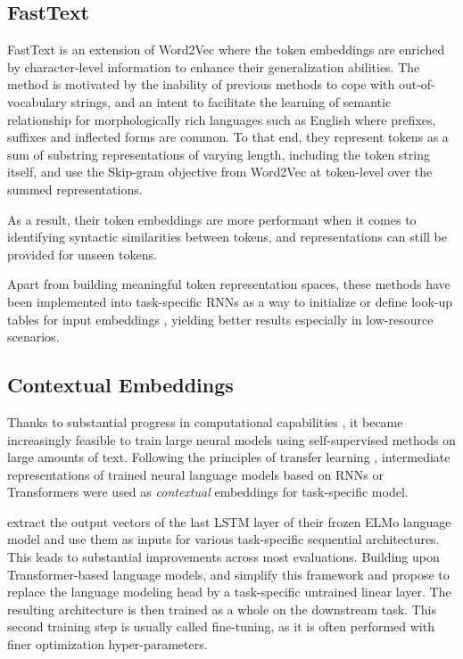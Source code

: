 \subsection{FastText}

FastText \citep{bojanowski-etal-2017-enriching} is an extension of Word2Vec where the token embeddings are enriched by character-level information to enhance their generalization abilities. The method is motivated by the inability of previous methods to cope with out-of-vocabulary strings, and an intent to facilitate the learning of semantic relationship for morphologically rich languages such as English where prefixes, suffixes and inflected forms are common. To that end, they represent tokens as a sum of substring representations of varying length, including the token string itself, and use the Skip-gram objective from Word2Vec at token-level over the summed representations. 

As a result, their token embeddings are more performant when it comes to identifying syntactic similarities between tokens, and representations can still be provided for unseen tokens.

Apart from building meaningful token representation spaces, these methods have been implemented into task-specific RNNs as a way to initialize or define look-up tables for input embeddings \citep{lstm_w2v, MUHAMMAD2021728}, yielding better results especially in low-resource scenarios.

\subsection{Contextual Embeddings}

Thanks to substantial progress in computational capabilities \citep{owens_gpu}, it became increasingly feasible to train large neural models using self-supervised methods on large amounts of text. Following the principles of transfer learning \citep{tl_survey}, intermediate representations of trained neural language models based on RNNs or Transformers were used as \textit{contextual} embeddings for task-specific model. 

\citet{peters-etal-2018-deep} extract the output vectors of the last LSTM layer of their frozen ELMo language model and use them as inputs for various task-specific sequential architectures. This leads to substantial improvements across most evaluations. Building upon Transformer-based language models, \citet{devlin-etal-2019-bert} and \citet{Radford2018ImprovingLU} simplify this framework and propose to replace the language modeling head by a task-specific untrained linear layer. The resulting architecture is then trained as a whole on the downstream task. This second training step is usually called fine-tuning, as it is often performed with finer optimization hyper-parameters.

